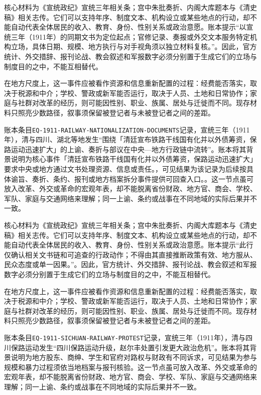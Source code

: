 核心材料为《宣统政纪》宣统三年相关条；宫中朱批奏折、内阁大库题本与《清史稿》相关志传。它们可以支持年序、制度文本、机构设立或某些地点的行动，却不能自动代表全体居民的收入、教育、身份、性别关系或政治意愿。账本提示“以宣统三年（1911年）的同期文书为定位起点；官修记录、奏报或外交文本服务特定机构立场，具体日期、规模、地方执行与对手视角须以独立材料复核。”。因此，官方统计、外交措辞、报刊论战、教会叙述和军报数字必须分别置于生成它们的立场与制度目的之中，不能互相替代。

在地方尺度上，这一事件应被看作资源和信息重新配置的过程：经费能否落实，取决于税源和中介；学校、警政或新军能否运行，取决于人员、土地和日常协作；家庭与社群对改革的经历，则可能因性别、职业、族属、居处与迁徙而不同。现存材料只照亮少数路径，叙事须保留被登记者与未被登记者之间的差距。

账本条目\texttt{EQ-1911-RAILWAY-NATIONALIZATION-DOCUMENTS}记录，宣统三年（1911年），清与四川、湖北等地发生“围绕「清廷宣布铁路干线国有化并以外债筹资，保路运动迅速扩大」的上谕、奏折与部议在中央—地方行政链中流转”。账本将其背景说明为核心事件「清廷宣布铁路干线国有化并以外债筹资，保路运动迅速扩大」要求中央或地方通过文书处理资源、信息或责任。，可见结果为该记录为后续按具体谕旨、奏折、条约、报刊或地方档案拆分事件提供可回查入口。。这一节点虽可放入改革、外交或革命的宏观年表，却不能脱离省份财政、地方官、商会、学校、军队、家庭与交通网络来理解；同一上谕、条约或战事在不同地域的实际后果并不一致。

核心材料为《宣统政纪》宣统三年相关条；宫中朱批奏折、内阁大库题本与《清史稿》相关志传。它们可以支持年序、制度文本、机构设立或某些地点的行动，却不能自动代表全体居民的收入、教育、身份、性别关系或政治意愿。账本提示“此行仅确认相关文书链和可追查的行政动作；不得由其直接推断政策有效、地方服从、民众态度或单一因果。”。因此，官方统计、外交措辞、报刊论战、教会叙述和军报数字必须分别置于生成它们的立场与制度目的之中，不能互相替代。

在地方尺度上，这一事件应被看作资源和信息重新配置的过程：经费能否落实，取决于税源和中介；学校、警政或新军能否运行，取决于人员、土地和日常协作；家庭与社群对改革的经历，则可能因性别、职业、族属、居处与迁徙而不同。现存材料只照亮少数路径，叙事须保留被登记者与未被登记者之间的差距。

账本条目\texttt{EQ-1911-SICHUAN-RAILWAY-PROTEST}记录，宣统三年（1911年），清与四川保路运动发生“四川保路运动升级，赵尔丰处置引发更大政治危机”。账本将其背景说明为地方股东、商绅、学生和官府对路权与财政有不同诉求，可见结果为参与规模和暴力过程须依当地档案与报刊核验。这一节点虽可放入改革、外交或革命的宏观年表，却不能脱离省份财政、地方官、商会、学校、军队、家庭与交通网络来理解；同一上谕、条约或战事在不同地域的实际后果并不一致。

